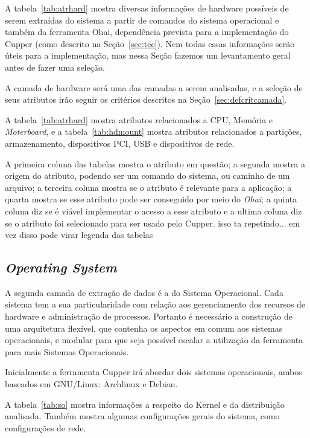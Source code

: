 A tabela~\ref{tab:atrhard} mostra diversas informações de hardware possíveis de serem extraídas
do sistema a partir de comandos do sistema operacional e também da ferramenta Ohai, 
dependência prevista para a implementação do Cupper (como descrito na 
Seção~\ref{sec:tec}). Nem todas essas informações serão úteis para a 
implementação, mas nessa Seção fazemos um levantamento geral antes de fazer uma
seleção.

A camada de hardware será uma das camadas a serem analisadas, e a seleção de 
seus atributos irão seguir os critérios descritos na Seção~\ref{sec:defcritcamada}.

A tabela~\ref{tab:atrhard} mostra atributos relacionados a CPU, Memória e 
\textit{Moterboard}, e a tabela~\ref{tab:hdmount} mostra atributos relacionados
a partições, armazenamento, dispositivos PCI, USB e dispositivos de rede.

A primeira coluna das tabelas mostra o atributo em questão; a segunda mostra
a origem do atributo, podendo ser um comando do sistema, ou caminho de um arquivo;
a terceira coluna mostra se o atributo é relevante para a aplicação; a quarta mostra se
esse atributo pode ser conseguido por meio do \textit{Ohai}; a quinta coluna 
diz se é viável implementar o acesso a esse atributo e a ultima coluna
diz se o atributo foi selecionado para ser usado pelo Cupper. {\color{red} isso ta repetindo... em vez disso pode virar legenda das tabelas}


\subsection{\textit{Operating System}}
\label{sec:cam-os}

A segunda camada de extração de dados é a do Sistema Operacional. 
Cada sistema tem a sua particularidade com relação aos gerenciamento dos 
recursos de hardware e administração de processos. Portanto é necessário a 
construção de uma arquitetura flexível, que contenha os aspectos em comum aos
sistemas operacionais, e modular para que seja possível escalar a utilização 
da ferramenta para mais Sistemas Operacionais.

Inicialmente a ferramenta Cupper irá abordar dois sistemas operacionais, 
ambos baseados em GNU/Linux: Archlinux e Debian.

A tabela~\ref{tab:so} mostra informações a respeito do Kernel e da distribuição
analisada. Também mostra algumas configurações gerais do sistema, como
configurações de rede.

